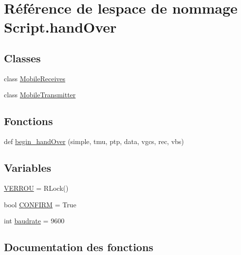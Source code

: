 \hypertarget{namespaceScript_1_1handOver}{}\section{Référence de l\textquotesingle{}espace de nommage Script.\+hand\+Over}
\label{namespaceScript_1_1handOver}
\subsection*{Classes}
\begin{DoxyCompactItemize}
\item 
class \hyperlink{classScript_1_1handOver_1_1MobileReceives}{Mobile\+Receives}
\item 
class \hyperlink{classScript_1_1handOver_1_1MobileTransmitter}{Mobile\+Transmitter}
\end{DoxyCompactItemize}
\subsection*{Fonctions}
\begin{DoxyCompactItemize}
\item 
def \hyperlink{namespaceScript_1_1handOver_a4d9a0e646528d168d925b4bcd6f078a6}{begin\+\_\+hand\+Over} (simple, tmu, ptp, data, vgcs, rec, vbs)
\end{DoxyCompactItemize}
\subsection*{Variables}
\begin{DoxyCompactItemize}
\item 
\hyperlink{namespaceScript_1_1handOver_a94f94a457b98f7aa4528c5118490f262}{V\+E\+R\+R\+OU} = R\+Lock()
\item 
bool \hyperlink{namespaceScript_1_1handOver_a1f8a11e1df500a2ab144549e8f3e4703}{C\+O\+N\+F\+I\+RM} = True
\item 
int \hyperlink{namespaceScript_1_1handOver_a10996755a745f6ffa98a8c5235d8d4b3}{baudrate} = 9600
\end{DoxyCompactItemize}


\subsection{Documentation des fonctions}
\mbox{\label{namespaceScript_1_1handOver_a4d9a0e646528d168d925b4bcd6f078a6}} 
